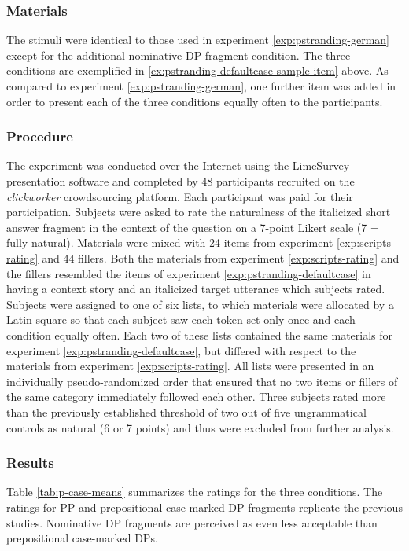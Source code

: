 \subsubsection{Materials}
The stimuli were identical to those used in experiment \ref{exp:pstranding-german} except for the additional nominative DP fragment condition. The three conditions are exemplified in \ref{ex:pstranding-defaultcase-sample-item} above. As compared to experiment \ref{exp:pstranding-german}, one further item was added in order to present each of the three conditions equally often to the participants.

\subsubsection{Procedure}
The experiment was conducted over the Internet using the LimeSurvey presentation software and completed by 48 participants recruited on the \textit{clickworker} crowdsourcing platform. Each participant was paid  for their participation. Subjects were asked to rate the naturalness of the italicized short answer fragment in the context of the question on a 7-point Likert scale (7 = fully natural). Materials were mixed with 24 items from experiment \ref{exp:scripts-rating} and 44 fillers. Both the materials from experiment \ref{exp:scripts-rating} and the fillers resembled the items of experiment \ref{exp:pstranding-defaultcase} in having a context story and an italicized target utterance which subjects rated. Subjects were assigned to one of six lists, to which materials were allocated by a Latin square so that each subject saw each token set only once and each condition equally often. Each two of these lists contained the same materials for experiment \ref{exp:pstranding-defaultcase}, but differed with respect to the materials from experiment \ref{exp:scripts-rating}. All lists were presented in an individually pseudo-randomized order that ensured that no two items or fillers of the same category immediately followed each other. Three subjects rated more than the previously established threshold of two out of five ungrammatical controls as natural (6 or 7 points) and thus were excluded from further analysis.

\subsubsection{Results} 
Table \ref{tab:p-case-means} summarizes the ratings for the three conditions. The ratings for PP and prepositional case-marked DP fragments replicate the previous studies. Nominative DP fragments are perceived as even less acceptable than prepositional case-marked DPs.

